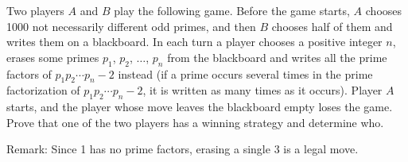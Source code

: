 Two players $A$ and $B$ play the following game.  Before the game starts, $A$ chooses 1000 not necessarily different odd primes, and then $B$ chooses half of them and writes them on a blackboard.  In each turn a player chooses a positive integer $n$,  erases some primes $p_1$,  $p_2$,  $\dots$,  $p_n$ from the blackboard and writes all the prime factors of $p_1 p_2 \dotsm p_n - 2$ instead (if a prime occurs several times in the prime factorization of $p_1 p_2 \dotsm p_n - 2$,  it is written as many times as it occurs).  Player $A$ starts, and the player whose move leaves the blackboard empty loses the game.  Prove that one of the two players has a winning strategy and determine who.

Remark: Since 1 has no prime factors, erasing a single 3 is a legal move.